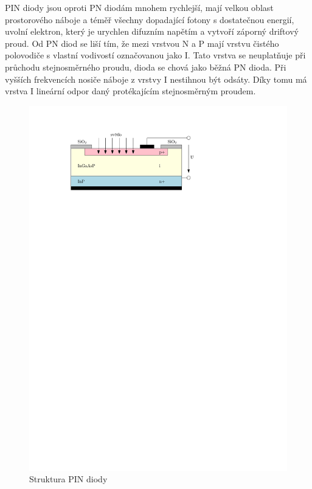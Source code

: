 PIN diody jsou oproti PN diodám mnohem rychlejší, mají velkou oblast prostorového náboje a téměř všechny dopadající fotony s dostatečnou energií, uvolní elektron, který je urychlen difuzním napětím a vytvoří záporný driftový proud. Od PN diod se liší tím, že mezi vrstvou N a P mají vrstvu čistého polovodiče s vlastní vodivostí označovanou jako I. Tato vrstva se neuplatňuje při průchodu stejnosměrného proudu, dioda se chová jako běžná PN dioda. Při vyšších frekvencích nosiče náboje z vrstvy I nestihnou být odsáty. Díky tomu má vrstva I lineární odpor daný protékajícím stejnosměrným proudem.

\begin{figure}[H]
    \begin{center}
        \includegraphics[scale=1]{img/pin}
    \end{center}
    \caption{Struktura PIN diody}
\end{figure}

